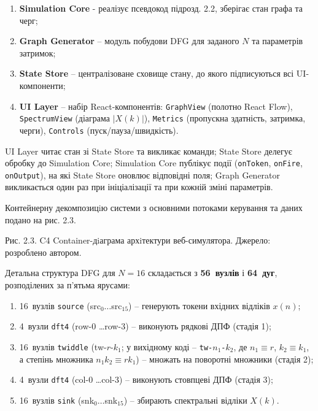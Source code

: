 \documentclass[
]{article}
\begin{document}
\begin{enumerate}
\def\labelenumi{\arabic{enumi}.}
\item
  \textbf{Simulation Core} - реалізує псевдокод підрозд. 2.2, зберігає
  стан графа та черг;
\item
  \textbf{Graph Generator} -- модуль побудови DFG для заданого \(N\) та
  параметрів затримок;
\item
  \textbf{State Store} -- централізоване сховище стану, до якого
  підписуються всі UI-компоненти;
\item
  \textbf{UI Layer} -- набір React-компонентів: \texttt{GraphView}
  (полотно React Flow), \texttt{SpectrumView} (діаграма \(|X(k)|\)),
  \texttt{Metrics} (пропускна здатність, затримка, черги),
  \texttt{Controls} (пуск/пауза/швидкість).
\end{enumerate}

UI Layer читає стан зі State Store та викликає команди; State Store
делегує обробку до Simulation Core; Simulation Core публікує події
(\texttt{onToken}, \texttt{onFire}, \texttt{onOutput}), на які State
Store оновлює відповідні поля; Graph Generator викликається один раз при
ініціалізації та при кожній зміні параметрів.

Контейнерну декомпозицiю системи з основними потоками керування та даних
подано на рис. 2.3.

Рис. 2.3. C4 Container-дiаграма архiтектури веб-симулятора. Джерело:
розроблено автором.

Детальна структура DFG для \(N = 16\) складається з \textbf{56~вузлів} і
\textbf{64~дуг}, розподілених за п'ятьма ярусами:

\begin{enumerate}
\def\labelenumi{\arabic{enumi}.}
\item
  16~вузлів \texttt{source} (src\(_{0}\ldots\)src\(_{15}\)) -- генерують
  токени вхідних відліків \(x(n)\);
\item
  4~вузли \texttt{dft4} (row-0 \ldots row-3) -- виконують рядкові ДПФ
  (стадія 1);
\item
  16~вузлів \texttt{twiddle} (tw-\(r\)-\(k_{1}\); у вихідному коді --
  \texttt{tw-}\(n_{1}\)\texttt{-}\(k_{2}\), де \(n_{1} \equiv r\),
  \(k_{2} \equiv k_{1}\), а степінь множника \(n_{1}k_{2} \equiv rk_{1}\)) --
  множать на поворотні множники (стадія 2);
\item
  4~вузли \texttt{dft4} (col-0 \ldots col-3) -- виконують стовпцеві ДПФ
  (стадія 3);
\item
  16~вузлів \texttt{sink} (snk\(_{0}\ldots\)snk\(_{15}\)) -- збирають
  спектральні відліки \(X(k)\).
\end{enumerate}
\end{document}
